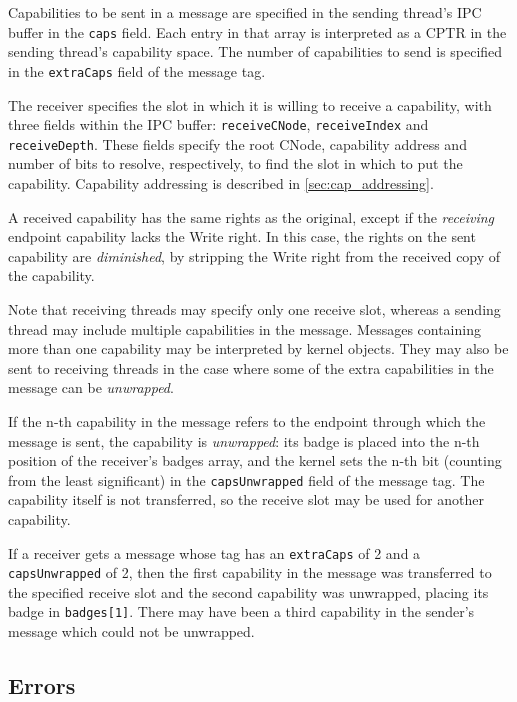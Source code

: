 Capabilities to be sent in a message are specified in the sending thread's
IPC buffer in the \texttt{caps} field. Each entry in that array is interpreted
as a CPTR in the sending thread's capability space. The number of capabilities
to send is specified in the \texttt{extraCaps} field of the message tag.

The receiver specifies the slot
in which it is willing to receive a capability, with three fields within the IPC buffer: \texttt{receiveCNode}, \texttt{receiveIndex} and \texttt{receiveDepth}.
These fields specify the root CNode, capability address and number of bits to resolve, respectively, to find
the slot in which to put the capability. Capability
addressing is described in \autoref{sec:cap_addressing}.

A received capability has the same rights as the original, except if
the \emph{receiving} endpoint capability lacks the Write right.
In this case, the rights on the sent capability are \emph{diminished}, by
stripping the Write right from the received copy of the capability.

Note that receiving threads may specify only one receive slot, whereas a
sending thread may include multiple capabilities in the message. Messages
containing more than one capability may be interpreted by kernel objects. They
may also be sent to receiving threads in the case where some of the extra
capabilities in the message can be \emph{unwrapped}.

If the n-th capability in the message refers to the endpoint through
which the message is sent, the capability is \emph{unwrapped}: its badge is placed into
the n-th
position of the receiver's badges array, and the kernel sets the n-th bit (counting from the
least significant) in the \texttt{capsUnwrapped} field of the message
tag. The capability itself is not transferred, so the receive slot may be used
for another capability.

If a receiver gets a message whose tag has an \texttt{extraCaps} of 2 and a
\texttt{capsUnwrapped} of 2, then the first capability in the message was
transferred to the specified receive slot and the second capability was
unwrapped, placing its badge in \texttt{badges[1]}. There may have been a
third capability in the sender's message which could not be unwrapped.

\subsection{Errors}

